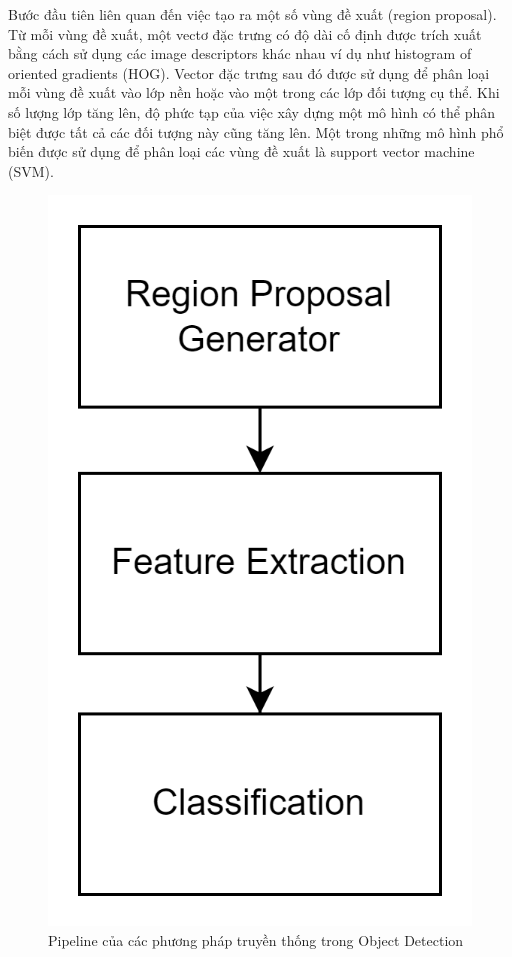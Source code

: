 Bước đầu tiên liên quan đến việc tạo ra một số vùng đề xuất (region proposal). Từ mỗi vùng đề xuất, một vectơ đặc trưng có độ dài cố định được trích xuất bằng cách sử dụng các image descriptors khác nhau ví dụ như histogram of oriented gradients (HOG). Vector đặc trưng sau đó được sử dụng để phân loại mỗi vùng đề xuất vào lớp nền hoặc vào một trong các lớp đối tượng cụ thể. Khi số lượng lớp tăng lên, độ phức tạp của việc xây dựng một mô hình có thể phân biệt được tất cả các đối tượng này cũng tăng lên. Một trong những mô hình phổ biến được sử dụng để phân loại các vùng đề xuất là support vector machine (SVM).
\graphicspath{{figures/}}
\begin{figure}[h!]
  \centering
  \includegraphics[scale=0.25]{graphics/pipeline.png}
  \caption{Pipeline của các phương pháp truyền thống trong Object Detection}
\end{figure}
